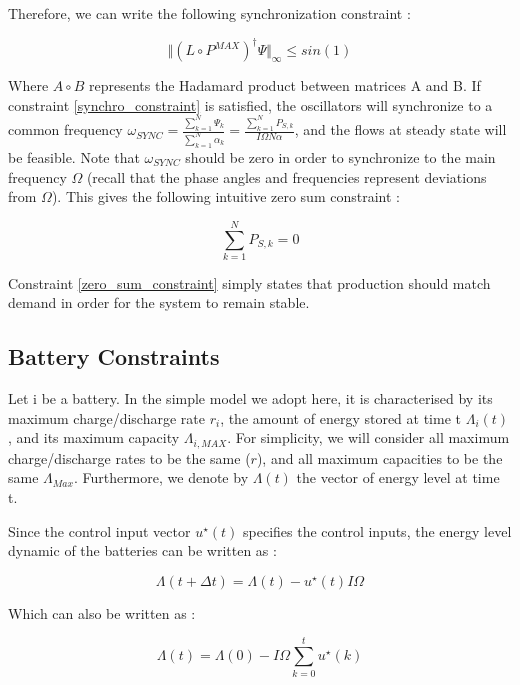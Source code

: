 \documentclass[10pt,twoside%
                ,draft%
        ]{article}
\begin{document}
Therefore, we can write the following synchronization constraint :

\begin{equation}
\label{synchro_constraint}
\Vert \left( L \circ P^{MAX} \right)^{\dagger} \Psi \Vert_{\infty} \leq sin(1)
\end{equation}

Where $ A \circ B $ represents the Hadamard product between matrices A and B. If constraint \ref{synchro_constraint} is satisfied, the oscillators will synchronize to a common frequency $ \omega_{SYNC} = \frac{\sum_{k=1}^{N}\Psi_k}{\sum_{k=1}^{N}\alpha_k} = \frac{\sum_{k=1}^{N}P_{S,k}}{I\Omega N \alpha}$, and the flows at steady state will be feasible. Note that $\omega_{SYNC} $ should be zero in order to synchronize to the main frequency $\Omega$ (recall that the phase angles and frequencies represent deviations from $ \Omega$). This gives the following intuitive zero sum constraint :

\begin{equation}
\label{zero_sum_constraint}
\sum_{k=1}^{N} P_{S,k} = 0
\end{equation}

Constraint \ref{zero_sum_constraint} simply states that production should match demand in order for the system to remain stable.


\subsection{Battery Constraints}

Let i be a battery. In the simple model we adopt here, it is characterised by its maximum charge/discharge rate $r_i$, the amount of energy stored at time t $ \Lambda_i(t) $, and its maximum capacity $ \Lambda_{i, MAX} $. For simplicity, we will consider all maximum charge/discharge rates to be the same ($r$), and all maximum capacities to be the same $\Lambda_{Max}$. Furthermore, we denote by $ \Lambda(t) $ the vector of energy level at time t.

Since the control input vector $ u^{\star}(t) $ specifies the control inputs, the energy level dynamic of the batteries can be written as :

\begin{equation}
\Lambda(t+\Delta t) = \Lambda(t) - u^{\star}(t) I \Omega 
\end{equation}

Which can also be written as :

\begin{equation}
\Lambda(t)  = \Lambda(0) - I \Omega \sum_{k=0}^{t}u^{\star}(k)
\end{equation}
\end{document}
